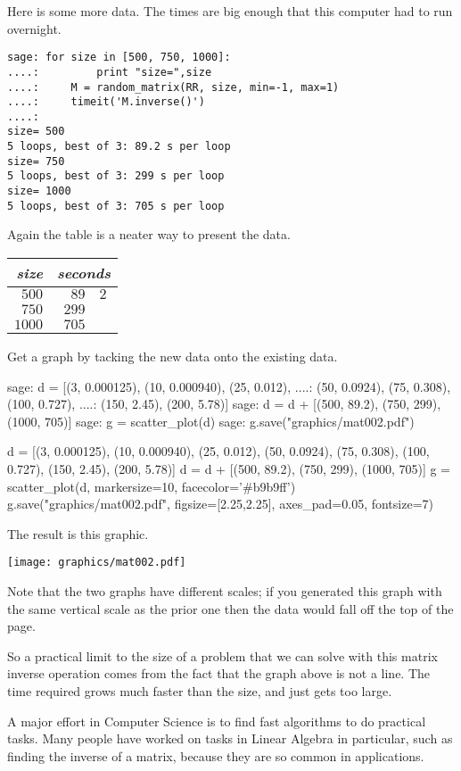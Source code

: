 Here is some more data.
The times are big enough that this computer had to run overnight.
\begin{lstlisting}
sage: for size in [500, 750, 1000]:                             
....:         print "size=",size
....:     M = random_matrix(RR, size, min=-1, max=1)
....:     timeit('M.inverse()')
....: 
size= 500
5 loops, best of 3: 89.2 s per loop
size= 750
5 loops, best of 3: 299 s per loop
size= 1000
5 loops, best of 3: 705 s per loop
\end{lstlisting}
Again the table is a neater way to present the data.
\begin{center}
  \begin{tabular}{r|r@{.}l}
    \textit{size}     &\multicolumn{2}{c}{\textit{seconds}}  \\  \hline
    $500$       &$89$ &$2$ \\
    $750$       &$299$ &   \\
    $1000$      &$705$ &   
  \end{tabular}
\end{center}
Get a graph by tacking the new data onto the existing data.
\begin{sagecommandline}
sage: d = [(3, 0.000125), (10, 0.000940), (25, 0.012),  
....:      (50, 0.0924), (75, 0.308), (100, 0.727), 
....:      (150, 2.45), (200, 5.78)]
sage: d = d + [(500, 89.2), (750, 299), (1000, 705)]
sage: g = scatter_plot(d)                           
sage: g.save("graphics/mat002.pdf")                      
\end{sagecommandline}
\begin{sagesilent}
d = [(3, 0.000125), (10, 0.000940), (25, 0.012),  
     (50, 0.0924), (75, 0.308), (100, 0.727), 
     (150, 2.45), (200, 5.78)]
d = d + [(500, 89.2), (750, 299), (1000, 705)]
g = scatter_plot(d, markersize=10, facecolor='#b9b9ff')
g.save("graphics/mat002.pdf", figsize=[2.25,2.25], axes_pad=0.05, fontsize=7)              
\end{sagesilent}
The result is this graphic.
\begin{center}
  \texttt{[image: graphics/mat002.pdf]}
\end{center}
Note that the two graphs have different scales;
if you generated this graph with the same vertical scale as the prior one
then the data would fall off the top of the page.

So a practical limit to the size of a problem that we can solve with
this matrix inverse operation comes from the fact that the graph above is
not a line.
The time required grows much faster than the size, and just gets too large. 

A major effort in Computer Science is to find fast algorithms to 
do practical tasks.
Many people have worked on tasks in Linear Algebra in particular,
such as finding the inverse of a matrix, because
they are so common in applications.

\endinput


TODO:
